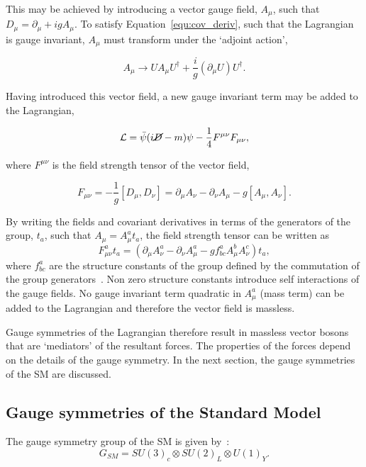 \noindent This may be achieved by introducing a vector gauge field, $A_\mu$, such that 
$D_{\mu} = \partial_{\mu} + igA_{\mu}$. To satisfy Equation~\ref{equ:cov_deriv},
such that the Lagrangian is gauge invariant, $A_{\mu}$ must transform
under the `adjoint action',

\begin{equation}
A_{\mu} \rightarrow U A_{\mu} U^{\dagger} + \frac{i}{g}(\partial_{\mu}U)U^{\dagger}.
\end{equation}

\noindent Having introduced this vector field, a new gauge invariant term may be added to the Lagrangian,

\begin{equation}
\mathcal{L} = \bar{\psi} (i\cancel{D} - m)\psi - \frac{1}{4}F^{\mu\nu}F_{\mu\nu},
\end{equation}

\noindent where $F^{\mu\nu}$ is the field strength tensor of the vector field,

\begin{equation}
F_{\mu\nu} = - \frac{1}{g}\left[D_{\mu},D_{\nu}\right] = \partial_{\mu}A_{\nu} - \partial_{\nu} A_{\mu} - g\left[A_{\mu},A_{\nu}\right].
\end{equation}

\noindent By writing the fields and covariant derivatives in terms of the generators of the group, $t_{a}$, such
that $A_{\mu} = A^{a}_{\mu} t_{a}$, the field strength tensor can be written as 
\begin{equation}
F^{a}_{\mu\nu}t_{a} = \left(\partial_{\mu}A^{a}_{\nu} - \partial_{\nu} A^{a}_{\mu} - g f_{bc}^{a}A^b_{\mu}A^c_{\nu}\right)t_a,
\end{equation}
where $f_{bc}^{a}$ are the structure constants of the group defined by the 
commutation of the group generators~\cite{wei1963lie}. Non zero structure constants introduce
self interactions of the gauge fields. No gauge invariant term quadratic 
in $A^a_\mu$ (mass term) can be added to the Lagrangian and 
therefore the vector field is massless.

Gauge symmetries of the Lagrangian therefore result in massless vector 
bosons that are `mediators' of the resultant forces. The properties of
the forces depend on the details of the gauge symmetry. 
In the next section, the gauge symmetries
of the SM are discussed. 

\subsection{Gauge symmetries of the Standard Model}
\label{sec:sm-gs}
The gauge symmetry group of the SM is given by~\cite{ewk-int}:
\begin{equation}
G_{SM} = SU(3)_{c}\otimes SU(2)_{L}\otimes U(1)_{Y}.
\end{equation}

